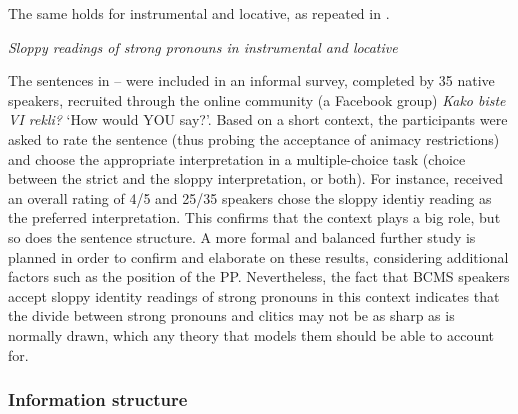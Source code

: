 \documentclass[output=paper,colorlinks,citecolor=brown]{langscibook}
\begin{document}
\noindent The same holds for instrumental and locative, as repeated in .

\ea \label{ppsloppy2} \textit{Sloppy readings of strong pronouns in instrumental and locative}
\z \z

\noindent The sentences in -- were included in an informal survey, completed by 35 native speakers, recruited through the online community (a Facebook group) \textit{Kako biste VI rekli?} `How would YOU say?'. Based on a short context, the participants were asked to rate the sentence (thus probing the acceptance of animacy restrictions) and choose the appropriate interpretation in a multiple-choice task (choice between the strict and the sloppy interpretation, or both). For instance,  received an overall rating of 4/5 and 25/35 speakers chose the sloppy identiy reading as the preferred interpretation. This confirms that the context plays a big role, but so does the sentence structure. A more formal and balanced further study is planned in order to confirm and elaborate on these results, considering additional factors such as the position of the PP. Nevertheless, the fact that BCMS speakers accept sloppy identity readings of strong pronouns in this context indicates that the divide between strong pronouns and clitics may not be as sharp as is normally drawn, which any theory that models them should be able to account for.  

\subsubsection{Information structure}\label{subsubsec:informationstructure}
\end{document}
